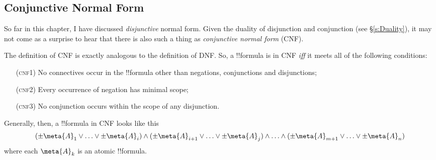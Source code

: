 \documentclass[../../../include/open-logic-section]{subfiles}
\begin{document}
\subsection{Conjunctive Normal Form}\label{s:CNF}
So far in this chapter, I have discussed \emph{disjunctive} normal form. Given the duality of disjunction and conjunction (see \S\ref{s:Duality}), it may not come as a surprise to hear that there is also such a thing as \emph{conjunctive normal form} (CNF).

The definition of CNF is exactly analogous to the definition of DNF. So, a !!{formula} is in CNF \emph{iff} it meets all of the following conditions:
	\begin{itemize}
		\item[(\textsc{cnf1})] No connectives occur in the !!{formula} other than negations, conjunctions and disjunctions;
		\item[(\textsc{cnf2})] Every occurrence of negation has minimal scope;
		\item[(\textsc{cnf3})] No conjunction occurs within the scope of any disjunction. 
	\end{itemize}
Generally, then, a !!{formula} in CNF looks like this
	$$(\pm \meta{A}_1 \lor \ldots \lor \pm \meta{A}_i) \land (\pm \meta{A}_{i+1} \lor \ldots \lor \pm\meta{A}_j) \land \ldots \land (\pm\meta{A}_{m+1} \lor\ldots \lor \pm \meta{A}_n)$$
where each $\meta{A}_k$ is an atomic !!{formula}.
\end{document}
